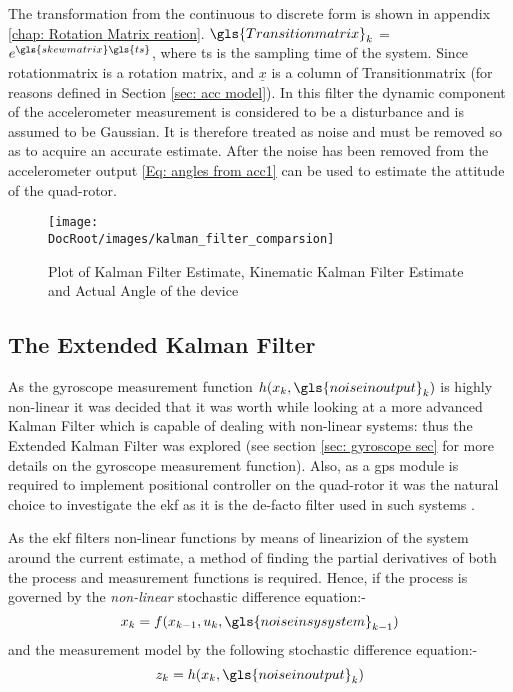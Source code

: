 The transformation from the continuous to discrete form is shown in appendix \ref{chap: Rotation Matrix reation}. $\gls{Transitionmatrix}_k$ = $e^{\gls{skewmatrix}\gls{ts}}$, where \gls{ts} is the sampling time of the system. Since \gls{rotationmatrix} is a rotation matrix, and $\underline{x}$ is a column of \gls{Transitionmatrix} (for reasons defined in Section \ref{sec: acc model}). In this filter the dynamic component of the accelerometer measurement is considered to be a disturbance and is assumed to be Gaussian. It is therefore treated as noise and must be removed so as to acquire an accurate estimate. After the noise has been removed from the accelerometer output \eqref{Eq: angles from acc1} can be used to estimate the attitude of the quad-rotor.



\begin{figure}[h]
	\centering
	\texttt{[image: \\DocRoot/images/kalman\_filter\_comparsion]}
	\caption{Plot of Kalman Filter Estimate, Kinematic Kalman Filter Estimate and Actual Angle of the device}
	\label{Fig: Kalman Filter Estimate and Kinematic Kalman Filter Estimate1}
\end{figure}




\subsection{The Extended Kalman Filter }
As the gyroscope measurement function $h(x_k,\gls{noiseinoutput}_k)$ is highly non-linear it was decided that it was worth while looking at a more advanced Kalman Filter which is capable of dealing with non-linear systems: thus the Extended Kalman Filter was explored (see section \ref{sec: gyroscope sec} for more details on the gyroscope measurement function). Also, as a \gls{gps} module is required to implement positional controller on the quad-rotor it was the natural choice to investigate the \gls{ekf} as it is the de-facto filter used in such systems \cite{An_Introduction_to_the_Kalman_Filter}. 






As the \gls{ekf} filters non-linear functions by means of linearizion of the system around the current
estimate, a method of finding the partial derivatives of both the process and measurement functions is required. Hence, if the process is governed by the \textit{non-linear} stochastic difference equation:-
\begin{equation}
x_k = f(x_{k-1},u_k,\gls{noiseinsysystem}_{k-1})
\end{equation}
and the measurement model by the following stochastic difference equation:-
\begin{equation}
z_k = h(x_k,\gls{noiseinoutput}_k)
\end{equation}

